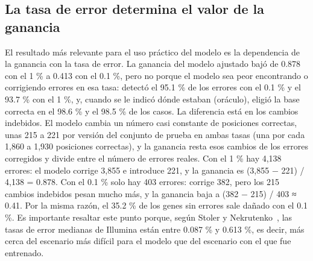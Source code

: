 \documentclass[sigconf,nonacm]{acmart}
\begin{document}
\subsection{La tasa de error determina el valor de la ganancia}\label{sec:disc-tasa}

El resultado más relevante para el uso práctico del modelo es la dependencia de la ganancia con la tasa de error. La ganancia del modelo ajustado bajó de 0.878 con el 1 \% a 0.413 con el 0.1 \%, pero no porque el modelo sea peor encontrando o corrigiendo errores en esa tasa: detectó el 95.1 \% de los errores con el 0.1 \% y el 93.7 \% con el 1 \%, y, cuando se le indicó dónde estaban (oráculo), eligió la base correcta en el 98.6 \% y el 98.5 \% de los casos. La diferencia está en los cambios indebidos. El modelo cambia un número casi constante de posiciones correctas, unas 215 a 221 por versión del conjunto de prueba en ambas tasas (una por cada 1,860 a 1,930 posiciones correctas), y la ganancia resta esos cambios de los errores corregidos y divide entre el número de errores reales. Con el 1 \% hay 4,138 errores: el modelo corrige 3,855 e introduce 221, y la ganancia es (3,855 − 221) / 4,138 = 0.878. Con el 0.1 \% solo hay 403 errores: corrige 382, pero los 215 cambios indebidos pesan mucho más, y la ganancia baja a (382 − 215) / 403 ≈ 0.41. Por la misma razón, el 35.2 \% de los genes sin errores sale dañado con el 0.1 \%. Es importante resaltar este punto porque, según Stoler y Nekrutenko~\cite{stoler2021sequencing}, las tasas de error medianas de Illumina están entre 0.087 \% y 0.613 \%, es decir, más cerca del escenario más difícil para el modelo que del escenario con el que fue entrenado.
\end{document}

